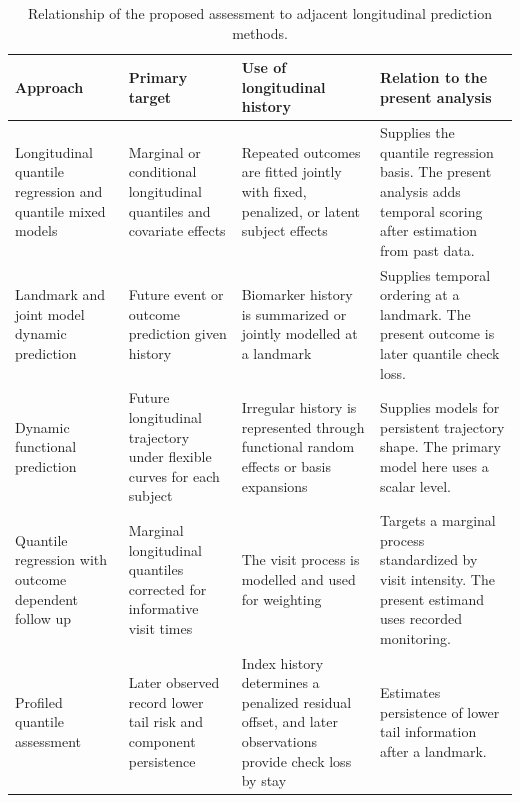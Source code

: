 \begin{table}[!htbp]
\caption{Relationship of the proposed assessment to adjacent longitudinal prediction methods.}
\label{tab:prior_method_map}
\centering
\scriptsize
\setlength{\tabcolsep}{3pt}
\renewcommand{\arraystretch}{1.10}
\begin{tabular}{>{\raggedright\arraybackslash}p{}>{\raggedright\arraybackslash}p{}>{\raggedright\arraybackslash}p{}>{\raggedright\arraybackslash}p{}}
\toprule
Approach & Primary target & Use of longitudinal history & Relation to the present analysis\\
\midrule
Longitudinal quantile regression and quantile mixed models & Marginal or conditional longitudinal quantiles and covariate effects & Repeated outcomes are fitted jointly with fixed, penalized, or latent subject effects & Supplies the quantile regression basis. The present analysis adds temporal scoring after estimation from past data.\\
Landmark and joint model dynamic prediction & Future event or outcome prediction given history & Biomarker history is summarized or jointly modelled at a landmark & Supplies temporal ordering at a landmark. The present outcome is later quantile check loss.\\
Dynamic functional prediction & Future longitudinal trajectory under flexible curves for each subject & Irregular history is represented through functional random effects or basis expansions & Supplies models for persistent trajectory shape. The primary model here uses a scalar level.\\
Quantile regression with outcome dependent follow up & Marginal longitudinal quantiles corrected for informative visit times & The visit process is modelled and used for weighting & Targets a marginal process standardized by visit intensity. The present estimand uses recorded monitoring.\\
Profiled quantile assessment & Later observed record lower tail risk and component persistence & Index history determines a penalized residual offset, and later observations provide check loss by stay & Estimates persistence of lower tail information after a landmark.\\
\bottomrule
\end{tabular}
\end{table}
